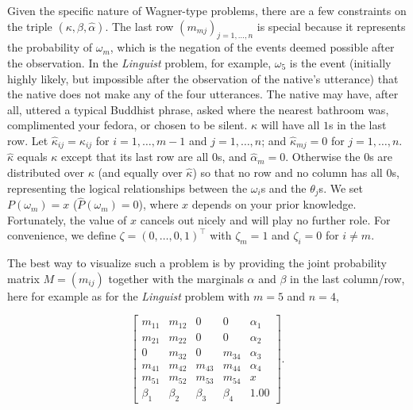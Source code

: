 \documentclass[11pt]{article}
\begin{document}
Given the specific nature of Wagner-type problems, there are a few
constraints on the triple $(\kappa,\beta,\hat{\alpha})$. The last row
$(m_{mj})_{j=1,\ldots,n}$ is special because it represents the
probability of $\omega_{m}$, which is the negation of the events
deemed possible after the observation. In the \emph{Linguist} problem,
for example, $\omega_{5}$ is the event (initially highly likely, but
impossible after the observation of the native's utterance) that the
native does not make any of the four utterances. The native may have,
after all, uttered a typical Buddhist phrase, asked where the nearest
bathroom was, complimented your fedora, or chosen to be silent.
$\kappa$ will have all $1$s in the last row. Let
$\hat{\kappa}_{ij}=\kappa_{ij}$ for $i=1,\ldots,m-1$ and
$j=1,\ldots,n$; and $\hat{\kappa}_{mj}=0$ for $j=1,\ldots,n$.
$\hat{\kappa}$ equals $\kappa$ except that its last row are all $0$s,
and $\hat{\alpha}_{m}=0$. Otherwise the $0$s are distributed over
$\kappa$ (and equally over $\hat{\kappa}$) so that no row and no
column has all $0$s, representing the logical relationships between
the $\omega_{i}$s and the $\theta_{j}$s. We set $P(\omega_{m})=x$
($\hat{P}(\omega_{m})=0$), where $x$ depends on your prior knowledge.
Fortunately, the value of $x$ cancels out nicely and will play no
further role. For convenience, we define
$\zeta=(0,\ldots,0,1)^{\intercal}$ with $\zeta_{m}=1$ and
$\zeta_{i}=0$ for $i\neq{}m$.

The best way to visualize such a problem is by providing the joint
probability matrix $M=(m_{ij})$ together with the marginals $\alpha$
and $\beta$ in the last column/row, here for example as for the
\emph{Linguist} problem with $m=5$ and $n=4$,

\begin{equation}
  \label{eq:m3}
      \left[
      \begin{array}{ccccc}
        m_{11} & m_{12} & 0 & 0 & \alpha_{1} \\
        m_{21} & m_{22} & 0 & 0 & \alpha_{2} \\
        0 & m_{32} & 0 & m_{34} & \alpha_{3} \\
        m_{41} & m_{42} & m_{43} & m_{44} & \alpha_{4} \\
        m_{51} & m_{52} & m_{53} & m_{54} & x \\
        \beta_{1} & \beta_{2} & \beta_{3} & \beta_{4} & 1.00
      \end{array}
\right].
\end{equation}
\end{document}
